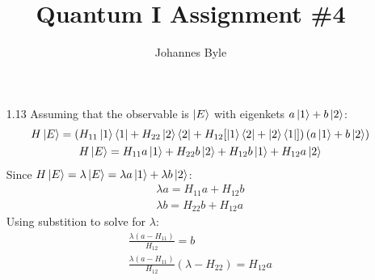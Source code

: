 \documentclass[12pt]{article}
\title{Quantum I Assignment \#4}
\author{Johannes Byle}
\begin{document}
  \maketitle
  \begin{enumerate}
    \item[1.13]
    Assuming that the observable is $\ket{E}$ with eigenkets $a\ket{1}+b\ket{2}$:
    \begin{gather}
      H\ket{E}=\left(H_{11}\ket{1}\bra{1}+H_{22}\ket{2}\bra{2}+H_{12}[\ket{1}\bra{2}+\ket{2}\bra{1}]\right)(a\ket{1}+b\ket{2})\\
      H\ket{E}=H_{11}a\ket{1}+H_{22}b\ket{2}+H_{12}b\ket{1}+H_{12}a\ket{2}
    \end{gather}
    Since $H\ket{E}=\lambda\ket{E}=\lambda a\ket{1}+\lambda b\ket{2}$:
    \begin{gather}
      \lambda a=H_{11}a+H_{12}b\\
      \lambda b=H_{22}b+H_{12}a
    \end{gather}
    Using substition to solve for $\lambda$:
    \begin{gather}
      \frac{\lambda(a-H_{11})}{H_{12}}=b\\
      \frac{\lambda(a-H_{11})}{H_{12}}(\lambda-H_{22})=H_{12}a
    \end{gather}
  \end{enumerate}
\end{document}
